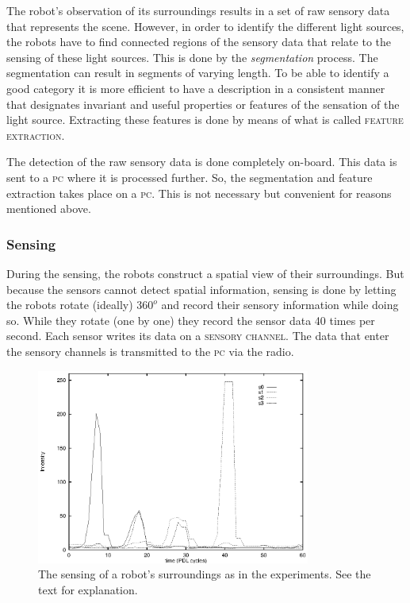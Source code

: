 \newpage The robot's observation of its surroundings results in a set of raw sensory data that represents the scene. However, in order to identify the different light sources, the robots have to find connected regions of the sensory data that relate to the sensing of these light sources. This is done by the {\itshape segmentation} process. The segmentation can result in segments of varying length. To be able to identify a good category it is more efficient to have a description in a consistent manner that designates invariant and useful properties or features of the sensation of the light source. Extracting these features is done by means of what is called {\scshape feature extraction}.

\enlargethispage{1\baselineskip}
The detection of the raw sensory data is done completely on-board. This data is sent to a {\scshape pc} where it is processed further. So, the segmentation and feature extraction takes place on a {\scshape pc}. This is not necessary but convenient for reasons mentioned above.

\subsubsection{Sensing}

During the sensing, the robots construct a spatial view of their surroundings. But because the sensors cannot detect spatial information, sensing is done by letting the robots rotate (ideally) $360^o$ and record their sensory information while doing so. While they rotate (one by one) they record the sensor data 40 times per second. Each sensor writes its data on a {\scshape sensory channel}. The data that enter the sensory channels is transmitted to the {\scshape pc} via the radio.

\begin{figure}
\centerline{\includegraphics[width=9cm]{lang_games/perception1.eps}}
\caption{The sensing of a robot's surroundings as in the experiments. See the text for explanation.}
\label{f:perception1}
\end{figure}

